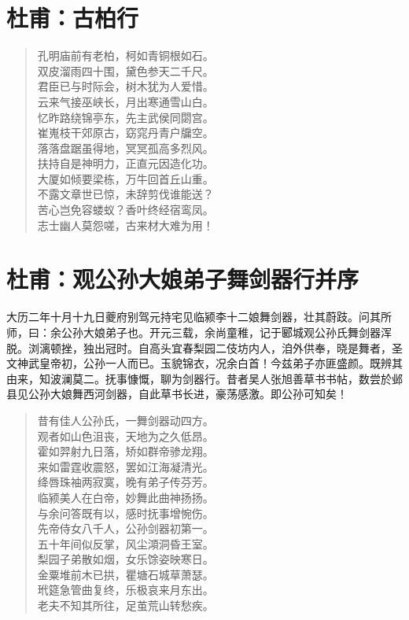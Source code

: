 \documentclass[12pt,oneside]{book}
\newenvironment{shici}{%
\begin{verse}\centering\yanti\large\hspace{12pt}}{\end{verse}}
\begin{document}
\begin{common-format}
\chapter{杜甫：古柏行}
\begin{shici}
孔明庙前有老柏，柯如青铜根如石。\\
双皮溜雨四十围，黛色参天二千尺。\\
君臣已与时际会，树木犹为人爱惜。\\
云来气接巫峡长，月出寒通雪山白。\\
忆昨路绕锦亭东，先主武侯同閟宫。\\
崔嵬枝干郊原古，窈窕丹青户牖空。\\
落落盘踞虽得地，冥冥孤高多烈风。\\
扶持自是神明力，正直元因造化功。\\
大厦如倾要梁栋，万牛回首丘山重。\\
不露文章世已惊，未辞剪伐谁能送？\\
苦心岂免容蝼蚁？香叶终经宿鸾凤。\\
志士幽人莫怨嗟，古来材大难为用！
\end{shici}

\chapter{杜甫：观公孙大娘弟子舞剑器行并序}
大历二年十月十九日夔府别驾元持宅见临颍李十二娘舞剑器，壮其蔚跂。问其所师，曰：余公孙大娘弟子也。开元三载，余尚童稚，记于郾城观公孙氏舞剑器浑脱。浏漓顿挫，独出冠时。自高头宜春梨园二伎坊内人，洎外供奉，晓是舞者，圣文神武皇帝初，公孙一人而已。玉貌锦衣，况余白首！今兹弟子亦匪盛颜。既辨其由来，知波澜莫二。抚事慷慨，聊为剑器行。昔者吴人张旭善草书书帖，数尝於邺县见公孙大娘舞西河剑器，自此草书长进，豪荡感激。即公孙可知矣！

\begin{shici}
昔有佳人公孙氏，一舞剑器动四方。\\
观者如山色沮丧，天地为之久低昂。\\
霍如羿射九日落，矫如群帝骖龙翔。\\
来如雷霆收震怒，罢如江海凝清光。\\
绛唇珠袖两寂寞，晚有弟子传芬芳。\\
临颍美人在白帝，妙舞此曲神扬扬。\\
与余问答既有以，感时抚事增惋伤。\\
先帝侍女八千人，公孙剑器初第一。\\
五十年间似反掌，风尘澒洞昏王室。\\
梨园子弟散如烟，女乐馀姿映寒日。\\
金粟堆前木已拱，瞿塘石城草萧瑟。\\
玳筵急管曲复终，乐极哀来月东出。\\
老夫不知其所往，足茧荒山转愁疾。
\end{shici}


\end{common-format}
\end{document}
